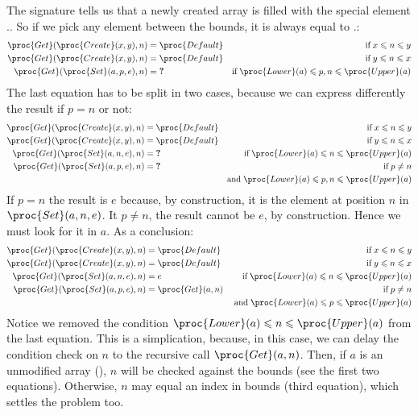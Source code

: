 \begin{itemize}
  The signature tells us that a newly created array is filled with the
  special element .. So if we pick any
  element between the bounds, it is always equal to
  .:
  \begin{align*}
     \proc{Get} (\proc{Create} (x, y), n) 
  &= \proc{Default}
  & \text{if} \; x \leqslant n \leqslant y\\
     \proc{Get} (\proc{Create} (x, y), n) 
  &= \proc{Default}
  & \text{if} \; y \leqslant n \leqslant x\\
     \proc{Get} (\proc{Set} (a, p, e), n)
  &= \textbf{?}
  & \text{if} \;\proc{Lower} (a) \leqslant p, n \leqslant \proc{Upper} (a)
  \end{align*}
  The last equation has to be split in two cases, because we can
  express differently the result if \(p = n\) or not:
  \begin{align*}
     \proc{Get} (\proc{Create} (x, y), n) 
  =& \;\proc{Default}
  & \text{if} \; x \leqslant n \leqslant y\\
     \proc{Get} (\proc{Create} (x, y), n) 
  =& \;\proc{Default}
  & \text{if} \; y \leqslant n \leqslant x\\
     \proc{Get} (\proc{Set} (a, n, e), n)
  =& \;\textbf{?}
  & \text{if} \;\proc{Lower} (a) \leqslant n \leqslant \proc{Upper}
     (a)\\
     \proc{Get} (\proc{Set} (a, p, e), n)
  =& \;\textbf{?} &  \text{if} \; p \neq n\\
  && \text{and} \;\proc{Lower} (a) \leqslant p, n \leqslant \proc{Upper}
     (a)
  \end{align*}
  If \(p = n\) the result is \(e\) because, by construction, it is the
  element at position \(n\) in \(\proc{Set} (a, n, e)\). It \(p \neq
  n\), the result cannot be \(e\), by construction. Hence we must look
  for it in \(a\). As a conclusion:
  \begin{align*}
     \proc{Get} (\proc{Create} (x, y), n) 
  =& \;\proc{Default}
  & \text{if} \; x \leqslant n \leqslant y\\
     \proc{Get} (\proc{Create} (x, y), n) 
  =& \;\proc{Default}
  & \text{if} \; y \leqslant n \leqslant x\\
     \proc{Get} (\proc{Set} (a, n, e), n)
  =& \;e
  & \;\text{if} \;\proc{Lower} (a) \leqslant n \leqslant \proc{Upper}
     (a)\\
     \proc{Get} (\proc{Set} (a, p, e), n)
  =& \;\proc{Get} (a, n)
  &  \text{if} \; p \neq n\\
  && \;\text{and} \;\proc{Lower} (a) \leqslant p \leqslant \proc{Upper}
    (a)
  \end{align*}
Notice we removed the condition \(\proc{Lower} (a) \leqslant n
\leqslant \proc{Upper} (a)\) from the last equation. This is a
simplication, because, in this case, we can delay the condition check
on \(n\) to the recursive call \(\proc{Get} (a, n)\). Then, if \(a\)
is an unmodified array (), \(n\) will be checked against
the bounds (see the first two equations). Otherwise, \(n\) may equal
an index in bounds (third equation), which settles the problem too.

\end{itemize}

